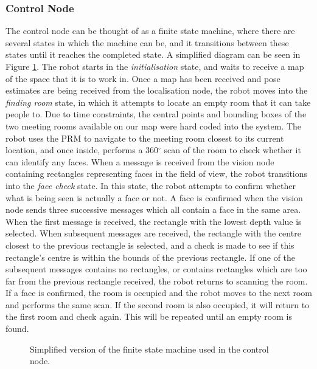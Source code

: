 \documentclass[conference]{IEEEtran}
\begin{document}
\subsubsection{Control Node}
The control node can be thought of as a finite state machine, where there are several states in which the machine can be, and it transitions between these states until it reaches the completed state. A simplified diagram can be seen in Figure \ref{fig:fsm}. The robot starts in the \emph{initialisation} state, and waits to receive a map of the space that it is to work in. Once a map has been received and pose estimates are being received from the localisation node, the robot moves into the \emph{finding room} state, in which it attempts to locate an empty room that it can take people to. Due to time constraints, the central points and bounding boxes of the two meeting rooms available on our map were hard coded into the system. The robot uses the PRM to navigate to the meeting room closest to its current location, and once inside, performs a 360$^\circ$ scan of the room to check whether it can identify any faces. When a message is received from the vision node containing rectangles representing faces in the field of view, the robot transitions into the \emph{face check} state. In this state, the robot attempts to confirm whether what is being seen is actually a face or not. A face is confirmed when the vision node sends three successive messages which all contain a face in the same area. When the first message is received, the rectangle with the lowest depth value is selected. When subsequent messages are received, the rectangle with the centre closest to the previous rectangle is selected, and a check is made to see if this rectangle's centre is within the bounds of the previous rectangle. If one of the subsequent messages contains no rectangles, or contains rectangles which are too far from the previous rectangle received, the robot returns to scanning the room. If a face is confirmed, the room is occupied and the robot moves to the next room and performs the same scan. If the second room is also occupied, it will return to the first room and check again. This will be repeated until an empty room is found.
\begin{figure}
  \centering
  \caption{Simplified version of the finite state machine used in the control node.}
  \label{fig:fsm}
\end{figure}
\end{document}
